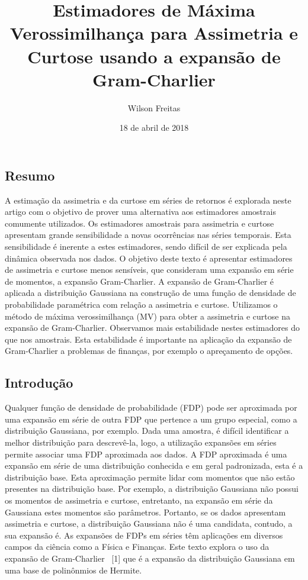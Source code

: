 \documentclass[]{article}
\title{Estimadores de Máxima Verossimilhança para Assimetria e Curtose usando a
expansão de Gram-Charlier}
\author{Wilson Freitas}
\date{18 de abril de 2018}
\begin{document}
\maketitle

\subsection{Resumo}\label{resumo}

A estimação da assimetria e da curtose em séries de retornos é explorada
neste artigo com o objetivo de prover uma alternativa aos estimadores
amostrais comumente utilizados. Os estimadores amostrais para assimetria
e curtose apresentam grande sensibilidade a novas ocorrências nas séries
temporais. Esta sensibilidade é inerente a estes estimadores, sendo
difícil de ser explicada pela dinâmica observada nos dados. O objetivo
deste texto é apresentar estimadores de assimetria e curtose menos
sensíveis, que consideram uma expansão em série de momentos, a expansão
Gram-Charlier. A expansão de Gram-Charlier é aplicada a distribuição
Gaussiana na construção de uma função de densidade de probabilidade
paramétrica com relação a assimetria e curtose. Utilizamos o método de
máxima verossimilhança (MV) para obter a assimetria e curtose na
expansão de Gram-Charlier. Observamos mais estabilidade nestes
estimadores do que nos amostrais. Esta estabilidade é importante na
aplicação da expansão de Gram-Charlier a problemas de finanças, por
exemplo o apreçamento de opções.

\subsection{Introdução}\label{introducao}

Qualquer função de densidade de probabilidade (FDP) pode ser aproximada
por uma expansão em série de outra FDP que pertence a um grupo especial,
como a distribuição Gaussiana, por exemplo. Dada uma amostra, é difícil
identificar a melhor distribuição para descrevê-la, logo, a utilização
expansões em séries permite associar uma FDP aproximada aos dados. A FDP
aproximada é uma expansão em série de uma distribuição conhecida e em
geral padronizada, esta é a distribuição base. Esta aproximação permite
lidar com momentos que não estão presentes na distribuição base. Por
exemplo, a distribuição Gaussiana não possui os momentos de assimetria e
curtose, entretanto, na expansão em série da Gaussiana estes momentos
são parâmetros. Portanto, se os dados apresentam assimetria e curtose, a
distribuição Gaussiana não é uma candidata, contudo, a sua expansão é.
As expansões de FDPs em séries têm aplicações em diversos campos da
ciência como a Física e Finanças. Este texto explora o uso da expansão
de Gram-Charlier ~{[}1{]} que é a expansão da distribuição Gaussiana em
uma base de polinônmios de Hermite.
\end{document}
